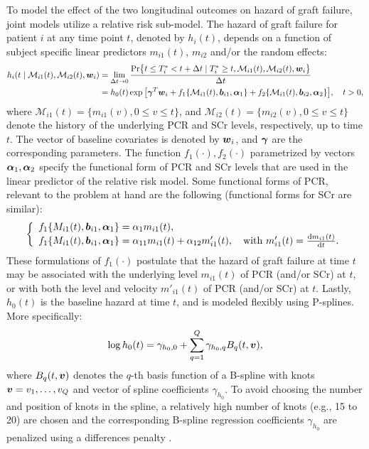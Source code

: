 To model the effect of the two longitudinal outcomes on hazard of graft failure, joint models utilize a relative risk sub-model. The hazard of graft failure for patient $i$ at any time point $t$, denoted by $h_i(t)$, depends on a function of subject specific linear predictors $m_{i1}(t)$, $m_{i2}$ and/or the random effects:
\begin{align*}
h_i(t \mid \mathcal{M}_{i1}(t), \mathcal{M}_{i2}(t), \boldsymbol{w}_i) &= \lim_{\Delta t \to 0} \frac{\mbox{Pr}\big\{t \leq T^*_i < t + \Delta t \mid T^*_i \geq t, \mathcal{M}_{i1}(t), \mathcal{M}_{i2}(t), \boldsymbol{w}_i\big\}}{\Delta t}\\
&=h_0(t) \exp\big[\boldsymbol{\gamma}^T\boldsymbol{w}_i + f_1\{\mathcal{M}_{i1}(t), \boldsymbol{b}_{i1}, \boldsymbol{\alpha}_1\} + f_2\{\mathcal{M}_{i1}(t), \boldsymbol{b}_{i2}, \boldsymbol{\alpha}_2\}\big], \quad t>0,
\end{align*}
where $\mathcal{M}_{i1}(t) = \{m_{i1}(v), 0\leq v \leq t\}$, and $\mathcal{M}_{i2}(t) = \{m_{i2}(v), 0\leq v \leq t\}$ denote the history of the underlying PCR and SCr levels, respectively, up to time $t$. The vector of baseline covariates is denoted by $\boldsymbol{w}_i$, and $\boldsymbol{\gamma}$ are the corresponding parameters. The function $f_1(\cdot), f_2(\cdot)$ parametrized by vectors $\boldsymbol{\alpha}_1, \boldsymbol{\alpha}_2$ specify the functional form of PCR and SCr levels \citep{brown2009assessing,rizopoulos2012joint,taylor2013real,rizopoulos2014bma} that are used in the linear predictor of the relative risk model. Some functional forms of PCR, relevant to the problem at hand are the following (functional forms for SCr are similar): 
\begin{eqnarray*}
\left \{
\begin{array}{l}
f_1\{M_{i1}(t), \boldsymbol{b}_{i1}, \boldsymbol{\alpha}_1\} = \alpha_1 m_{i1}(t),\\
f_1\{M_{i1}(t), \boldsymbol{b}_{i1}, \boldsymbol{\alpha}_1\} = \alpha_{11} m_{i1}(t) + \alpha_{12} m'_{i1}(t),\quad \text{with}\  m'_{i1}(t) = \frac{\mathrm{d}{m_{i1}(t)}}{\mathrm{d}{t}}.\\
\end{array}
\right.
\end{eqnarray*}
These formulations of $f_1(\cdot)$ postulate that the hazard of graft failure at time $t$ may be associated with the underlying level $m_{i1}(t)$ of PCR (and/or SCr) at $t$, or with both the level and velocity $m'_{i1}(t)$ of PCR (and/or SCr) at $t$. Lastly, $h_0(t)$ is the baseline hazard at time $t$, and is modeled flexibly using P-splines. More specifically:
\begin{equation*}
\log{h_0(t)} = \gamma_{h_0,0} + \sum_{q=1}^Q \gamma_{h_0,q} B_q(t, \boldsymbol{v}),
\end{equation*}
where $B_q(t, \boldsymbol{v})$ denotes the $q$-th basis function of a B-spline with knots $\boldsymbol{v} = v_1, \ldots, v_Q$ and vector of spline coefficients $\gamma_{h_0}$. To avoid choosing the number and position of knots in the spline, a relatively high number of knots (e.g., 15 to 20) are chosen and the corresponding B-spline regression coefficients $\gamma_{h_0}$ are penalized using a differences penalty \citep{eilers1996flexible}. 

